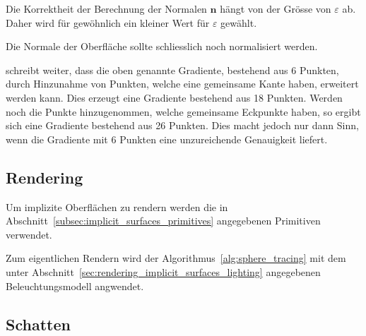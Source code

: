 Die Korrektheit der Berechnung der Normalen $\bm{n}$ hängt von der
Grösse von $\varepsilon$ ab. Daher wird für gewöhnlich ein kleiner Wert
für $\varepsilon$ gewählt.

Die Normale der Oberfläche sollte schliesslich noch normalisiert werden.

\cite{hart_ray_1989} schreibt weiter, dass die oben genannte Gradiente,
bestehend aus 6 Punkten, durch Hinzunahme von Punkten, welche eine
gemeinsame Kante haben, erweitert werden kann. Dies erzeugt eine
Gradiente bestehend aus 18 Punkten. Werden noch die Punkte
hinzugenommen, welche gemeinsame Eckpunkte haben, so ergibt sich eine
Gradiente bestehend aus 26 Punkten.
Dies macht jedoch nur dann Sinn, wenn die Gradiente mit 6 Punkten eine
unzureichende Genauigkeit liefert.

\subsection{Rendering}
\label{sec:rendering_implicit_surfaces_Rendering}

Um implizite Oberflächen zu rendern werden die in
Abschnitt~\ref{subsec:implicit_surfaces_primitives} angegebenen
Primitiven verwendet.

Zum eigentlichen Rendern wird der Algorithmus~\ref{alg:sphere_tracing}
mit dem unter Abschnitt~\ref{sec:rendering_implicit_surfaces_lighting}
angegebenen Beleuchtungsmodell angwendet.

\subsection{Schatten}
\label{sec:rendering_implicit_surfaces_shadows}
